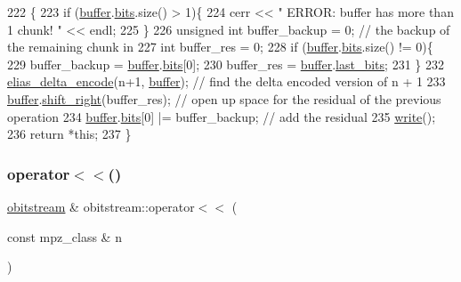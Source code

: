 \begin{DoxyCode}
222                                                          \{
223   \textcolor{keywordflow}{if} (\hyperlink{classobitstream_aeaccad00a395a404aa16472bfa052be3}{buffer}.\hyperlink{classbit__pipe_a86f38af1e9736b053728033490476b50}{bits}.size() > 1)\{
224     cerr << \textcolor{stringliteral}{" ERROR: buffer has more than 1 chunk! "} << endl;
225   \}
226   \textcolor{keywordtype}{unsigned} \textcolor{keywordtype}{int} buffer\_backup = 0; \textcolor{comment}{// the backup of the remaining chunk in }
227   \textcolor{keywordtype}{int} buffer\_res = 0; 
228   \textcolor{keywordflow}{if} (\hyperlink{classobitstream_aeaccad00a395a404aa16472bfa052be3}{buffer}.\hyperlink{classbit__pipe_a86f38af1e9736b053728033490476b50}{bits}.size() != 0)\{
229     buffer\_backup = \hyperlink{classobitstream_aeaccad00a395a404aa16472bfa052be3}{buffer}.\hyperlink{classbit__pipe_a86f38af1e9736b053728033490476b50}{bits}[0];
230     buffer\_res = \hyperlink{classobitstream_aeaccad00a395a404aa16472bfa052be3}{buffer}.\hyperlink{classbit__pipe_a0f3e84b02751803adaab499b5dad86fe}{last\_bits};
231   \}
232   \hyperlink{bitstream_8cpp_a63daa014203b9a5b2622a264cbfdff7b}{elias\_delta\_encode}(n+1, \hyperlink{classobitstream_aeaccad00a395a404aa16472bfa052be3}{buffer}); \textcolor{comment}{// find the delta encoded version of n + 1 }
233   \hyperlink{classobitstream_aeaccad00a395a404aa16472bfa052be3}{buffer}.\hyperlink{classbit__pipe_a341a1f62d728a67f730503ca722a7770}{shift\_right}(buffer\_res); \textcolor{comment}{// open up space for the residual of the previous
       operation}
234   \hyperlink{classobitstream_aeaccad00a395a404aa16472bfa052be3}{buffer}.\hyperlink{classbit__pipe_a86f38af1e9736b053728033490476b50}{bits}[0] |= buffer\_backup; \textcolor{comment}{// add the residual}
235   \hyperlink{classobitstream_a5ac23633932baad040856f0a33ee1ebf}{write}();
236   \textcolor{keywordflow}{return} *\textcolor{keyword}{this};
237 \}
\end{DoxyCode}
\mbox{\label{classobitstream_aed715e98e8b47e19e465da1445372229}} 
\subsubsection{\texorpdfstring{operator$<$$<$()}{operator<<()}\hspace{0.1cm}{\footnotesize\ttfamily [2/2]}}
{\footnotesize\ttfamily \hyperlink{classobitstream}{obitstream} \& obitstream\+::operator$<$$<$ (\begin{DoxyParamCaption}\item[{const mpz\+\_\+class \&}]{n }\end{DoxyParamCaption})}



